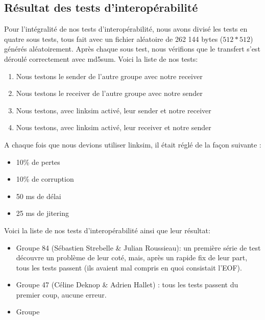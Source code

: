\documentclass[12pt,notitlepage]{report}
\begin{document}
\begin{appendices}
\section{Résultat des tests d'interopérabilité}
	Pour l'intégralité de nos tests d'interopérabilité, nous avons divisé les tests en quatre sous tests, tous fait avec un fichier aléatoire de 262 144 bytes ($512*512$) générés aléatoirement. Après chaque sous test, nous vérifions que le transfert s'est déroulé correctement avec md5sum. Voici la liste de nos tests:
\begin{enumerate}
\item Nous testons le sender de l'autre groupe avec notre receiver
\item Nous testons le receiver de l'autre groupe avec notre sender
\item Nous testons, avec linksim activé, leur sender et notre receiver
\item Nous testons, avec linksim activé, leur receiver et notre sender
\end{enumerate}	 
	A chaque fois que nous devions utiliser linksim, il était réglé de la façon suivante : 
	\begin{itemize}
	\item 10\% de pertes
	\item 10\% de corruption
	\item 50 ms de délai
	\item 25 ms de jitering
	\end{itemize}
\end{appendices}
Voici la liste de nos tests  d'interopérabilité ainsi que leur résultat:
\begin{itemize}
\item Groupe 84 (Sébastien Strebelle \& Julian Roussieau): un première série de test découvre un problème  de leur coté, mais, après un rapide fix de leur part, tous les tests passent (ils avaient mal compris en quoi consistait l'EOF).
\item Groupe 47 (Céline Deknop \& Adrien Hallet) : tous les tests passent du premier coup, aucune erreur.
\item Groupe 
\end{itemize}
\end{document}
